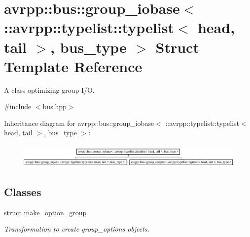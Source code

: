 \hypertarget{structavrpp_1_1bus_1_1group__iobase_3_01_1_1avrpp_1_1typelist_1_1typelist_3_01head_00_01tail_01_4_00_01bus__type_01_4}{
\section{avrpp::bus::group\_\-iobase$<$ ::avrpp::typelist::typelist$<$ head, tail $>$, bus\_\-type $>$ Struct Template Reference}
\label{structavrpp_1_1bus_1_1group__iobase_3_01_1_1avrpp_1_1typelist_1_1typelist_3_01head_00_01tail_01_4_00_01bus__type_01_4}
}


A class optimizing group I/O.  




{\ttfamily \#include $<$bus.hpp$>$}

Inheritance diagram for avrpp::bus::group\_\-iobase$<$ ::avrpp::typelist::typelist$<$ head, tail $>$, bus\_\-type $>$:\begin{figure}[H]
\begin{center}
\leavevmode
\includegraphics[height=1.238938cm]{structavrpp_1_1bus_1_1group__iobase_3_01_1_1avrpp_1_1typelist_1_1typelist_3_01head_00_01tail_01_4_00_01bus__type_01_4}
\end{center}
\end{figure}
\subsection*{Classes}
\begin{DoxyCompactItemize}
\item 
struct \hyperlink{structavrpp_1_1bus_1_1group__iobase_3_01_1_1avrpp_1_1typelist_1_1typelist_3_01head_00_01tail_01_a212532d66805ee5c98633543044dcc5}{make\_\-option\_\-group}
\begin{DoxyCompactList}\small\item\em Transformation to create group\_\-options objects. \item\end{DoxyCompactList}\end{DoxyCompactItemize}
